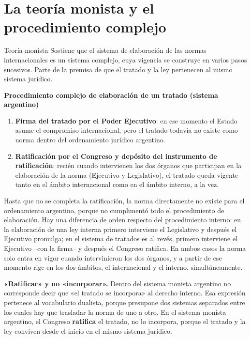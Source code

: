 \documentclass[12pt,oneside]{book}
\begin{document}
\section{La teoría monista y el procedimiento complejo}

\begin{definicion}{Teoría monista}
Sostiene que el sistema de elaboración de las normas internacionales es un sistema complejo, cuya vigencia se construye en varios pasos sucesivos. Parte de la premisa de que el tratado y la ley pertenecen al mismo sistema jurídico.
\end{definicion}

\begin{importante}
\textbf{Procedimiento complejo de elaboración de un tratado (sistema argentino)}
\begin{enumerate}
    \item \textbf{Firma del tratado por el Poder Ejecutivo}: en ese momento el Estado asume el compromiso internacional, pero el tratado todavía no existe como norma dentro del ordenamiento jurídico argentino. %
    \item \textbf{Ratificación por el Congreso y depósito del instrumento de ratificación}: recién cuando intervienen los dos órganos que participan en la elaboración de la norma (Ejecutivo y Legislativo), el tratado queda vigente tanto en el ámbito internacional como en el ámbito interno, a la vez.
\end{enumerate}
\end{importante}

Hasta que no se completa la ratificación, la norma directamente no existe para el ordenamiento argentino, porque no cumplimentó todo el procedimiento de elaboración. Hay una diferencia de orden respecto del procedimiento interno: en la elaboración de una ley interna primero interviene el Legislativo y después el Ejecutivo promulga; en el sistema de tratados es al revés, primero interviene el Ejecutivo --con la firma-- y después el Congreso ratifica. En ambos casos la norma solo entra en vigor cuando intervinieron los dos órganos, y a partir de ese momento rige en los dos ámbitos, el internacional y el interno, simultáneamente.

\begin{importante}
\textbf{«Ratificar» y no «incorporar».} Dentro del sistema monista argentino no corresponde decir que «el tratado se incorpora» al derecho interno. Esa expresión pertenece al vocabulario dualista, porque presupone dos sistemas separados entre los cuales hay que trasladar la norma de uno a otro. En el sistema monista argentino, el Congreso \textbf{ratifica} el tratado, no lo incorpora, porque el tratado y la ley conviven desde el inicio en el mismo sistema jurídico.
\end{importante}
\end{document}
